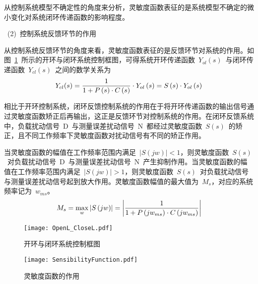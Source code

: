 从控制系统模型不确定性的角度来分析，灵敏度函数表征的是系统模型不确定的微小变化对系统闭环传递函数的影响程度。

~(2)~控制系统反馈环节的作用

从控制系统反馈环节的角度来看，灵敏度函数表征的是反馈环节对系统的作用。如图~\ref{fig:chap2:openl_closel}~所示的开环与闭环系统控制框图，可得系统开环传递函数~$Y_{ol}(s)$~与闭环传递函数~$Y_{cl}(s)$~之间的数学关系为
\begin{equation}\label{equ:chap3:Index10}
  Y_{cl}(s)=\displaystyle\frac{1}{1+P\left(s\right)\cdot C\left(s\right)}\cdot Y_{ol}\left(s\right)=S\left(s\right)\cdot Y_{ol}\left(s\right)
\end{equation}

相比于开环控制系统，闭环反馈控制系统的作用在于将开环传递函数的输出信号通过灵敏度函数矫正后再输出，这正是反馈环节对控制系统的作用。在闭环反馈系统中，负载扰动信号~D~与测量误差扰动信号~N~都经过灵敏度函数~$S\left(s\right)$~的矫正，且不同工作频率下灵敏度函数对扰动信号有不同的矫正作用。

当灵敏度函数的幅值在工作频率范围内满足~$\left\vert S\left(jw\right)\right\vert<1$，则灵敏度函数~$S\left(s\right)$~对负载扰动信号~D~与测量误差扰动信号~N~产生抑制作用。当灵敏度函数的幅值在工作频率范围内满足~$\left\vert S\left(jw\right)\right\vert>1$，则灵敏度函数~$S\left(s\right)$~对负载扰动信号与测量误差扰动信号起到放大作用。灵敏度函数幅值的最大值为~$M_s$，对应的系统频率记为~$w_{ms}$。
\begin{equation}\label{equ:chap3:Index11}
  M_s=\max\limits_{w}\left\vert S\left(jw\right)\right\vert=\left\vert\displaystyle\frac{1}{1+P\left(jw_{ms}\right)\cdot C\left(jw_{ms}\right)}\right\vert
\end{equation}

\begin{figure}[h]
  \centering
     \texttt{[image: OpenL\_CloseL.pdf]}\\
   \caption{开环与闭环系统控制框图}\label{fig:chap2:openl_closel}
\end{figure}
\begin{figure}[h]
  \centering
     \texttt{[image: SensibilityFunction.pdf]}\\
   \caption{灵敏度函数的作用}\label{fig:chap2:sensibilityfunction}
\end{figure}



